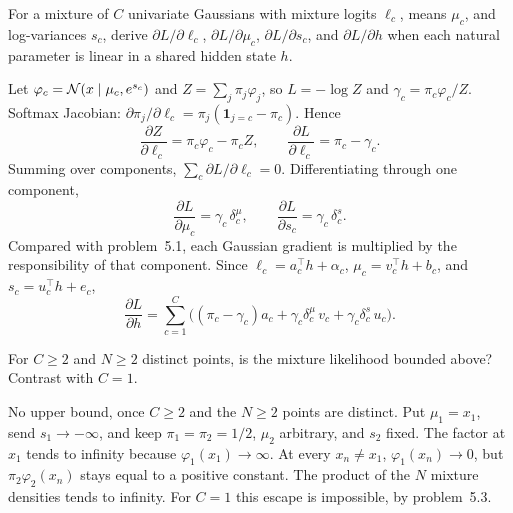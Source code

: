 \begin{hwqbox}
For a mixture of $C$ univariate Gaussians with mixture logits $\ell_c$, means $\mu_c$, and log-variances $s_c$, derive $\partial L/\partial\ell_c$, $\partial L/\partial\mu_c$, $\partial L/\partial s_c$, and $\partial L/\partial h$ when each natural parameter is linear in a shared hidden state $h$.
\end{hwqbox}
\begin{hwsolbox}
Let $\varphi_c=\mathcal{N}(x\mid\mu_c,e^{s_c})$ and $Z=\sum_j\pi_j\varphi_j$, so $L=-\log Z$ and $\gamma_c=\pi_c\varphi_c/Z$. Softmax Jacobian: $\partial\pi_j/\partial\ell_c=\pi_j(\mathbf 1_{j=c}-\pi_c)$. Hence
\[
\frac{\partial Z}{\partial\ell_c}=\pi_c\varphi_c-\pi_c Z,\qquad
\frac{\partial L}{\partial\ell_c}=\pi_c-\gamma_c.
\]
Summing over components, $\sum_c\partial L/\partial\ell_c=0$. Differentiating through one component,
\[
\frac{\partial L}{\partial\mu_c}=\gamma_c\,\delta^\mu_c,\qquad
\frac{\partial L}{\partial s_c}=\gamma_c\,\delta^s_c.
\]
Compared with problem~5.1, each Gaussian gradient is multiplied by the responsibility of that component. Since $\ell_c=a_c^\top h+\alpha_c$, $\mu_c=v_c^\top h+b_c$, and $s_c=u_c^\top h+e_c$,
\[
\frac{\partial L}{\partial h}
=\sum_{c=1}^C\Big((\pi_c-\gamma_c)a_c+\gamma_c\delta^\mu_c\,v_c+\gamma_c\delta^s_c\,u_c\Big).
\]
\end{hwsolbox}

\begin{hwqbox}
For $C\ge 2$ and $N\ge 2$ distinct points, is the mixture likelihood bounded above? Contrast with $C=1$.
\end{hwqbox}
\begin{hwsolbox}
No upper bound, once $C\ge 2$ and the $N\ge 2$ points are distinct. Put $\mu_1=x_1$, send $s_1\to-\infty$, and keep $\pi_1=\pi_2=1/2$, $\mu_2$ arbitrary, and $s_2$ fixed. The factor at $x_1$ tends to infinity because $\varphi_1(x_1)\to\infty$. At every $x_n\ne x_1$, $\varphi_1(x_n)\to 0$, but $\pi_2\varphi_2(x_n)$ stays equal to a positive constant. The product of the $N$ mixture densities tends to infinity. For $C=1$ this escape is impossible, by problem~5.3.
\end{hwsolbox}

